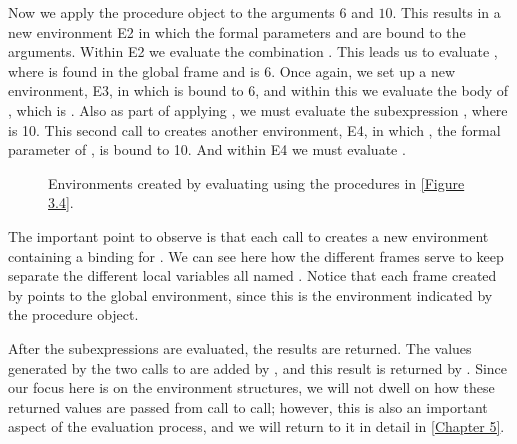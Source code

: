 Now we apply the procedure object  to the arguments \( 6 \) and \( 10 \).
This results in a new environment E2 in which the formal parameters  and  are bound to the arguments.
Within E2 we evaluate the combination .
This leads us to evaluate , where  is found in the global frame and  is \( 6 \).
Once again, we set up a new environment, E3, in which  is bound to \( 6 \), and within this we evaluate the body of , which is .
Also as part of applying , we must evaluate the subexpression , where  is 10.
This second call to  creates another environment, E4, in which , the formal parameter of , is bound to 10.
And within E4 we must evaluate .

\begin{figure}[tb]
	\centering
	
	\caption{
		Environments created by evaluating  using the procedures in \cref{Figure 3.4}.
	}
	\label{Figure 3.5}
\end{figure}

The important point to observe is that each call to  creates a new environment containing a binding for .
We can see here how the different frames serve to keep separate the different local variables all named .
Notice that each frame created by  points to the global environment, since this is the environment indicated by the  procedure object.

After the subexpressions are evaluated, the results are returned.
The values generated by the two calls to  are added by , and this result is returned by .
Since our focus here is on the environment structures, we will not dwell on how these returned values are passed from call to call;
however, this is also an important aspect of the evaluation process, and we will return to it in detail in \cref{Chapter 5}.



